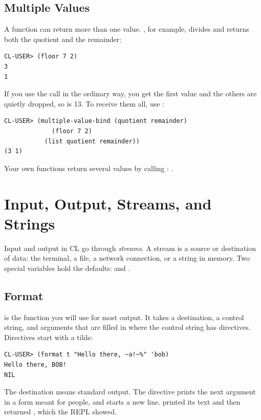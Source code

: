\subsection{Multiple Values}

A function can return more than one value. , for
example, divides and returns both the quotient and the remainder:

\begin{verbatim}
CL-USER> (floor 7 2)
3
1
\end{verbatim}

If you use the call in the ordinary way, you get the first value and
the others are quietly dropped, so  is 13.
To receive them all, use :

\begin{verbatim}
CL-USER> (multiple-value-bind (quotient remainder)
             (floor 7 2)
           (list quotient remainder))
(3 1)
\end{verbatim}

Your own functions return several values by calling :
.

\section{Input, Output, Streams, and Strings}

Input and output in CL go through \emph{streams}. A stream is a
source or destination of data: the terminal, a file, a network
connection, or a string in memory. Two special variables hold the
defaults:  and .

\subsection{Format}

 is the function you will use for most output. It takes
a destination, a control string, and arguments that are filled in
where the control string has directives. Directives start with a
tilde:

\begin{verbatim}
CL-USER> (format t "Hello there, ~a!~%" 'bob)
Hello there, BOB!
NIL
\end{verbatim}

The destination  means standard output. The directive
 prints the next argument in a form meant for people, and
\code{\td\%} starts a new line.  printed its text and
then returned , which the REPL showed.

